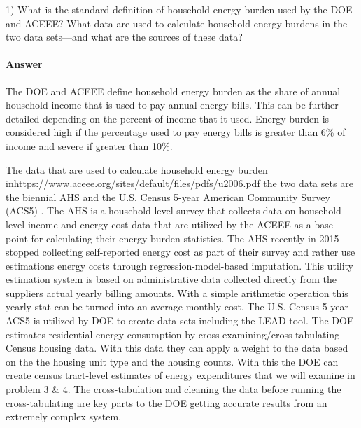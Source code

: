 \documentclass{article}
\begin{document}
 

1) What is the standard definition of household energy burden used by the DOE
and ACEEE? What data are used to calculate household energy burdens in the two
data sets—and what are the sources of these data?

\paragraph{Answer}

The DOE and ACEEE define household energy burden as the share of annual
household income that is used to pay annual energy bills. This can be further
detailed depending on the percent of income that it used. Energy burden is
considered high if the percentage used to pay energy bills is greater than
6\% of income and severe if greater than 10\%.


The data that are used to calculate household energy burden inhttps://www.aceee.org/sites/default/files/pdfs/u2006.pdf the two data sets
are the biennial AHS and the U.S. Census 5-year American Community Survey (ACS5)
. The AHS is a household-level survey that collects data on household-level
income and energy cost data that are utilized by the ACEEE as a base-point
for calculating their energy burden statistics. The AHS recently in 2015 stopped
collecting self-reported energy cost as part of their survey and rather use
estimations energy costs through regression-model-based imputation. This utility
estimation system is based on administrative data collected directly from the
suppliers actual yearly billing amounts. With a simple arithmetic operation this
yearly stat can be turned into an average monthly cost. The U.S. Census 5-year
ACS5 is utilized by DOE to create data sets including the LEAD tool. The DOE estimates residential
energy consumption by cross-examining/cross-tabulating Census housing data. With
this data they can apply a weight to the data based on the the housing unit type
and the housing counts. With this the DOE can create census tract-level
estimates of energy expenditures that we will examine in problem 3 \& 4. The
cross-tabulation and cleaning the data before running the cross-tabulating are
key parts to the DOE getting accurate results from an extremely complex system.


 
\end{document}
